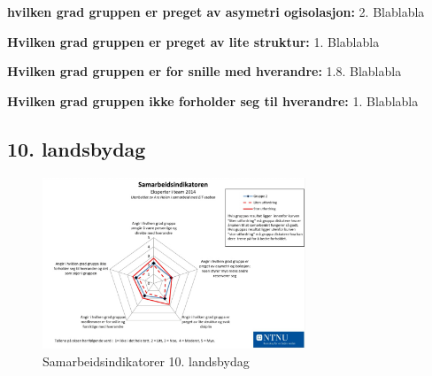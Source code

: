 \noindent \textbf{hvilken grad gruppen er preget av asymetri ogisolasjon:} 2.
\newline
\noindent Blablabla
\vspace{\secspace}

\noindent \textbf{Hvilken grad gruppen er preget av lite struktur:} 1.
\newline
\noindent Blablabla
\vspace{\secspace}

\noindent \textbf{Hvilken grad gruppen er for snille med hverandre:} 1.8.
\newline
\noindent Blablabla
\vspace{\secspace}

\noindent \textbf{Hvilken grad gruppen ikke forholder seg til hverandre:} 1.
\newline
\noindent Blablabla

\subsection{10. landsbydag}
\begin{figure}[H]
    \centering
    \includegraphics[width=0.7\textwidth]{images/samarbeidsindikator1.jpeg}	
    \caption{Samarbeidsindikatorer 10. landsbydag}
    \label{fig:sam2}
\end{figure}
